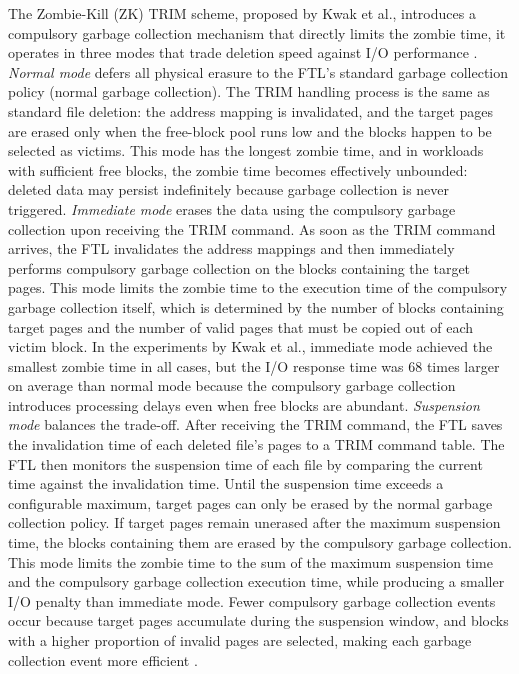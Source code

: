 The Zombie-Kill (ZK) TRIM scheme, proposed by Kwak et al., introduces a compulsory garbage 
collection mechanism that directly limits the zombie time, it operates in three modes that trade 
deletion speed against I/O performance \cite{antiforensics2016}. \textit{Normal mode} defers all physical 
erasure to the FTL's standard garbage collection policy (normal garbage collection). The TRIM handling process is 
the same as standard file deletion: the address mapping is invalidated, and the target pages are 
erased only when the free-block pool runs low and the blocks happen to be selected as victims. This 
mode has the longest zombie time, and in workloads with sufficient free blocks, the zombie time 
becomes effectively unbounded: deleted data may persist indefinitely because garbage collection is 
never triggered. \textit{Immediate mode} erases the data using the compulsory garbage collection upon receiving the 
TRIM command. As soon as the TRIM command arrives, the FTL invalidates the address mappings and 
then immediately performs compulsory garbage collection on the blocks containing the target pages. This mode limits 
the zombie time to the execution time of the compulsory garbage collection itself, which is determined by the 
number of blocks containing target pages and the number of valid pages that must be copied out of 
each victim block. In the experiments by Kwak et al., immediate mode achieved the smallest zombie 
time in all cases, but the I/O response time was 68 times larger on average than normal mode because 
the compulsory garbage collection introduces processing delays even when free blocks are abundant. \textit{Suspension 
mode} balances the trade-off. After receiving the TRIM command, the FTL saves the invalidation time 
of each deleted file's pages to a TRIM command table. The FTL then monitors the suspension time of 
each file by comparing the current time against the invalidation time. Until the suspension time 
exceeds a configurable maximum, target pages can only be erased by the normal garbage collection 
policy. If target pages remain unerased after the maximum suspension time, the blocks containing 
them are erased by the compulsory garbage collection. This mode limits the zombie time to the sum of the maximum 
suspension time and the compulsory garbage collection execution time, while producing a smaller I/O penalty than 
immediate mode. Fewer compulsory garbage collection events occur because target pages accumulate during the 
suspension window, and blocks with a higher proportion of invalid pages are selected, making each 
garbage collection event more efficient \cite{antiforensics2016}.


